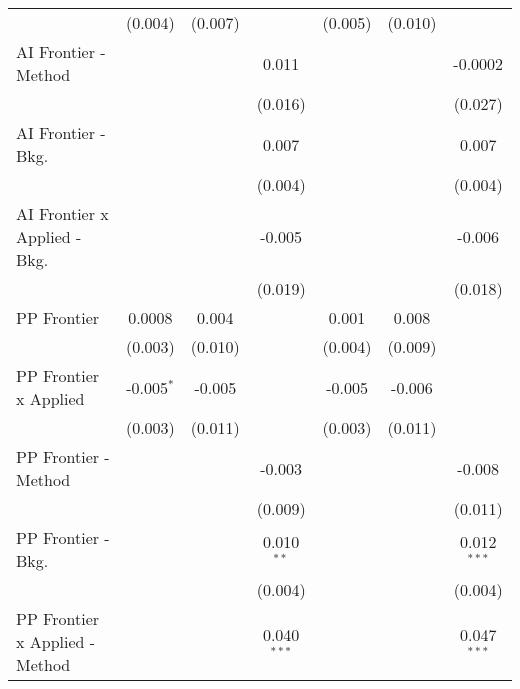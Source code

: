 \begin{tabular}{lcccccc}
                                  & (0.004)       & (0.007)        &                & (0.005)       & (0.010)       &   \\   
   AI Frontier - Method           &               &                & 0.011          &               &               & -0.0002\\   
                                  &               &                & (0.016)        &               &               & (0.027)\\   
   AI Frontier - Bkg.             &               &                & 0.007          &               &               & 0.007\\   
                                  &               &                & (0.004)        &               &               & (0.004)\\   
   AI Frontier x Applied - Bkg.   &               &                & -0.005         &               &               & -0.006\\   
                                  &               &                & (0.019)        &               &               & (0.018)\\   
   PP Frontier                    & 0.0008        & 0.004          &                & 0.001         & 0.008         &   \\   
                                  & (0.003)       & (0.010)        &                & (0.004)       & (0.009)       &   \\   
   PP Frontier x Applied          & -0.005$^{*}$  & -0.005         &                & -0.005        & -0.006        &   \\   
                                  & (0.003)       & (0.011)        &                & (0.003)       & (0.011)       &   \\   
   PP Frontier - Method           &               &                & -0.003         &               &               & -0.008\\   
                                  &               &                & (0.009)        &               &               & (0.011)\\   
   PP Frontier - Bkg.             &               &                & 0.010$^{**}$   &               &               & 0.012$^{***}$\\   
                                  &               &                & (0.004)        &               &               & (0.004)\\   
   PP Frontier x Applied - Method &               &                & 0.040$^{***}$  &               &               & 0.047$^{***}$\\   

\end{tabular}
